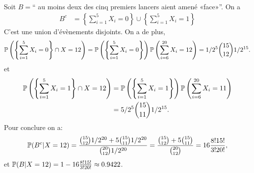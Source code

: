 \documentclass{tp_um}
\begin{document}
\begin{enumerate}
		Soit $B =$`` au moins deux des cinq premiers lancers aient amené «face»''.  On a
			\begin{align*}
				B^c &= \left\{ \sum_{i=1}^5 X_i = 0 \right\} \cup \left\{ \sum_{i=1}^5 X_i = 1 \right\}
			\end{align*}
			C'est une union d'évènements disjoints. On a de plus,
			\[
				\P\left(\left\{ \sum_{i=1}^5 X_i = 0 \right\}  \cap X=12 \right) =\P\left(\left\{ \sum_{i=1}^5 X_i = 0 \right\}  \right)\P\left( \sum_{i=6}^{20} X_i = 12 \right) = 1/2^5 \binom{15}{12} 1/2^{15}.
			\]
			et
			\begin{align*}
				\P\left( \left\{\sum_{i=1}^5 X_i = 1 \right\}   \cap X=12 \right) & =	\P\left( \left\{\sum_{i=1}^5 X_i = 1 \right\}  \right) \P\left( \sum_{i=6}^{20} X_i = 11 \right) \\ &= 5/2^5 \binom{15}{11} 1/2^{15}.
			\end{align*}
Pour conclure on a:
\[
	\P(B^c | X=12) = \frac{ \binom{15}{12} 1/2^{20} +  5\binom{15}{11} 1/2^{20} }{\binom{20}{12} 1/2^{20}} = \frac{ \binom{15}{12} +  5\binom{15}{11} }{\binom{20}{12}} = 16 \frac{8!15!}{3! 20!},
\]
et $\P(B | X=12) =1 -  16 \frac{8!15!}{3! 20!} \approx 0.9422$.

\end{enumerate}%

\end{document}
